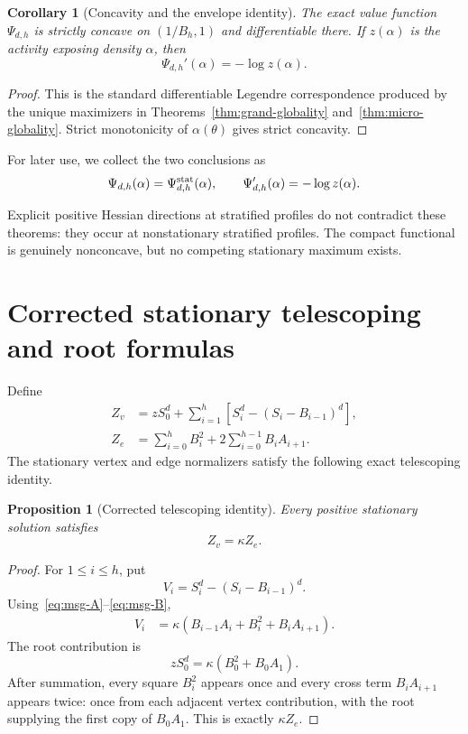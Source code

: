\documentclass[11pt]{amsart}
\newtheorem{proposition}[theorem]{Proposition}
\newtheorem{corollary}[theorem]{Corollary}
\theoremstyle{definition}
\begin{document}
\begin{corollary}[Concavity and the envelope identity]\label{cor:envelope}
The exact value function $\Psi_{d,h}$ is strictly concave on $(1/B_h,1)$ and differentiable there.  If $z(\alpha)$ is the activity exposing density $\alpha$, then
\[
 \boxed{
 \Psi_{d,h}'(\alpha)=-\log z(\alpha).
 }
\]
\end{corollary}

\begin{proof}
This is the standard differentiable Legendre correspondence produced by the unique maximizers in Theorems~\ref{thm:grand-globality} and~\ref{thm:micro-globality}.  Strict monotonicity of $\alpha(\theta)$ gives strict concavity.
\end{proof}

For later use, we collect the two conclusions as
\begin{equation}\label{eq:globality}
 \Psi_{d,h}(\alpha)=\Psi^{\rm stat}_{d,h}(\alpha),
 \qquad
 \Psi'_{d,h}(\alpha)=-\log z(\alpha).
\end{equation}

Explicit positive Hessian directions at stratified profiles do not contradict these theorems: they occur at nonstationary stratified profiles.  The compact functional is genuinely nonconcave, but no competing stationary maximum exists.


\section{Corrected stationary telescoping and root formulas}\label{sec:telescoping}
Define
\begin{align}
 Z_v&=zS_0^d+
 \sum_{i=1}^h
 \left[S_i^d-(S_i-B_{i-1})^d\right],
 \label{eq:Zv}\\
 Z_e&=\sum_{i=0}^hB_i^2
 +2\sum_{i=0}^{h-1}B_iA_{i+1}.
 \label{eq:Ze}
\end{align}
The stationary vertex and edge normalizers satisfy the following exact telescoping identity.

\begin{proposition}[Corrected telescoping identity]\label{prop:correct-telescope}
Every positive stationary solution satisfies
\[
 \boxed{Z_v=\kappa Z_e.}
\]
\end{proposition}

\begin{proof}
For $1\le i\le h$, put
\[
 V_i=S_i^d-(S_i-B_{i-1})^d.
\]
Using~\eqref{eq:msg-A}--\eqref{eq:msg-B},
\begin{align*}
 V_i
 &=\kappa\left(
 B_{i-1}A_i+B_i^2+B_iA_{i+1}
 \right).
\end{align*}
The root contribution is
\[
 zS_0^d=\kappa(B_0^2+B_0A_1).
\]
After summation, every square $B_i^2$ appears once and every cross term $B_iA_{i+1}$ appears twice: once from each adjacent vertex contribution, with the root supplying the first copy of $B_0A_1$.  This is exactly $\kappa Z_e$.
\end{proof}
\end{document}

